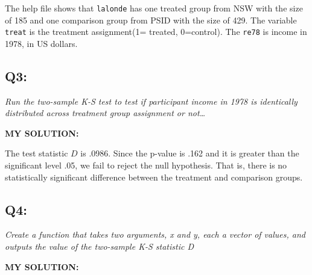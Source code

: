 \documentclass[
]{article}
\newenvironment{Shaded}{\begin{snugshade}}{\end{snugshade}}
\newcommand{\CommentTok}[1]{\textcolor[rgb]{0.56,0.35,0.01}{\textit{#1}}}
\newcommand{\DecValTok}[1]{\textcolor[rgb]{0.00,0.00,0.81}{#1}}
\newcommand{\ErrorTok}[1]{\textcolor[rgb]{0.64,0.00,0.00}{\textbf{#1}}}
\newcommand{\FloatTok}[1]{\textcolor[rgb]{0.00,0.00,0.81}{#1}}
\newcommand{\FunctionTok}[1]{\textcolor[rgb]{0.00,0.00,0.00}{#1}}
\newcommand{\NormalTok}[1]{#1}
\newcommand{\OtherTok}[1]{\textcolor[rgb]{0.56,0.35,0.01}{#1}}
\newcommand{\SpecialCharTok}[1]{\textcolor[rgb]{0.00,0.00,0.00}{#1}}
\begin{document}
The help file shows that \texttt{lalonde} has one treated group from NSW
with the size of 185 and one comparison group from PSID with the size of
429. The variable \texttt{treat} is the treatment assignment(1= treated,
0=control). The \texttt{re78} is income in 1978, in US dollars.

\hypertarget{q3}{%
\subsection{Q3:}\label{q3}}

\emph{Run the two-sample K-S test to test if participant income in 1978
is identically distributed across treatment group assignment or
not\ldots{}}

\textbf{MY SOLUTION:}

\begin{Shaded}
\end{Shaded}

The test statistic \(D\) is .0986. Since the p-value is .162 and it is
greater than the significant level .05, we fail to reject the null
hypothesis. That is, there is no statistically significant difference
between the treatment and comparison groups.

\hypertarget{q4}{%
\subsection{Q4:}\label{q4}}

\emph{Create a function that takes two arguments, x and y, each a vector
of values, and outputs the value of the two-sample K-S statistic D}

\textbf{MY SOLUTION:}
\end{document}
